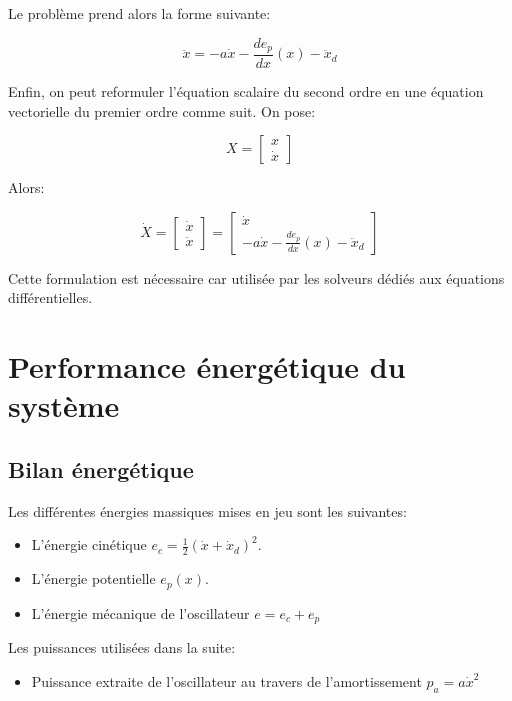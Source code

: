 \documentclass[a4paper,11pt,twoside]{article}
\begin{document}
Le problème prend alors la forme suivante:

\begin{equation}
\ddot{x} = -a \dot{x} - \frac{d e_p}{dx}(x) - \ddot{x}_d
\end{equation}

Enfin, on peut reformuler l'équation scalaire du second ordre en une équation vectorielle du premier ordre comme suit. On pose:

$$
X = \begin{bmatrix}
x \\
\dot x
\end{bmatrix}
$$

Alors:

$$
\dot X = \begin{bmatrix}
\dot x \\
\ddot x
\end{bmatrix}
=
\begin{bmatrix}
\dot x \\
-a \dot{x} -\frac{de_p}{dx}(x) -\ddot{x}_d
\end{bmatrix}
$$

Cette formulation est nécessaire car utilisée par les solveurs dédiés aux équations différentielles.

\section{Performance énergétique du système}

\subsection{Bilan énergétique}

Les différentes énergies massiques mises en jeu sont les suivantes:
\begin{itemize}
\item L'énergie cinétique $e_c = \frac{1}{2}(\dot x + \dot x_d)^2$.
\item L'énergie potentielle $e_p (x)$.
\item L'énergie mécanique de l'oscillateur $e = e_c + e_p$
\end{itemize}

Les puissances utilisées dans la suite:

\begin{itemize}
\item Puissance extraite de l'oscillateur au travers de l'amortissement $p_a = a \dot x^2$
\end{itemize}
\end{document}
